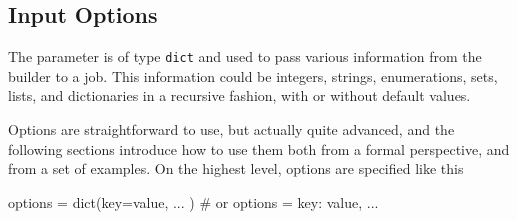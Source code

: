 


\subsection*{Input Options}

The \options parameter is of type \texttt{dict} and used to pass
various information from the builder to a job.  This information could
be integers, strings, enumerations, sets, lists, and dictionaries in a
recursive fashion, with or without default values.

Options are straightforward to use, but actually quite advanced, and
the following sections introduce how to use them both from a formal
perspective, and from a set of examples.  On the highest level,
options are specified like this
\begin{python}
  options = dict(key=value, ... )  # or
  options = {key: value, ...}
\end{python}


